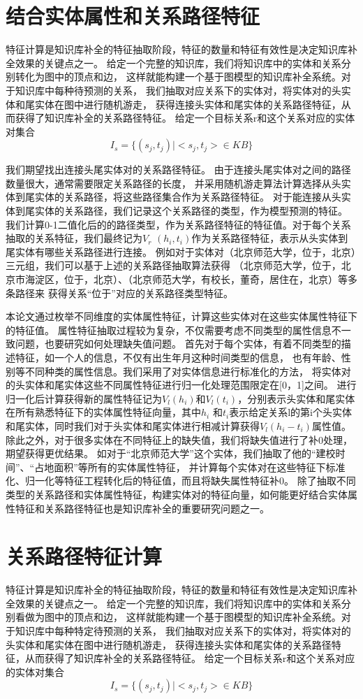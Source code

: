 \section{结合实体属性和关系路径特征}
特征计算是知识库补全的特征抽取阶段，特征的数量和特征有效性是决定知识库补全效果的关键点之一。
给定一个完整的知识库，我们将知识库中的实体和关系分别转化为图中的顶点和边，
这样就能构建一个基于图模型的知识库补全系统。对于知识库中每种待预测的关系，
我们抽取对应关系下的实体对，将实体对的头实体和尾实体在图中进行随机游走\cite{Lao2012}，
获得连接头实体和尾实体的关系路径特征，从而获得了知识库补全的关系路径特征。
给定一个目标关系r和这个关系对应的实体对集合
$$I_s=\{(s_j,t_j)|<s_j,t_j> \in KB\}$$

我们期望找出连接头尾实体对的关系路径特征。
由于连接头尾实体对之间的路径数量很大，通常需要限定关系路径的长度，
并采用随机游走算法计算选择从头实体到尾实体的关系路径，将这些路径集合作为关系路径特征。
对于能连接从头实体到尾实体的关系路径，我们记录这个关系路径的类型，作为模型预测的特征。
我们计算0-1二值化后的的路径类型，作为关系路径特征的特征值。对于每个关系抽取的关系特征，我们最终记为$V_r$ $(h_i,t_i)$作为关系路径特征，表示从头实体到尾实体有哪些关系路径进行连接。
例如对于实体对（北京师范大学，位于，北京）三元组，我们可以基于上述的关系路径抽取算法获得
（北京师范大学，位于，北京市海淀区，位于，北京）、（北京师范大学，有校长，董奇，居住在，北京）等多条路径来
获得关系“位于”对应的关系路径类型特征。

本论文通过枚举不同维度的实体属性特征，计算这些实体对在这些实体属性特征下的特征值。
属性特征抽取过程较为复杂，不仅需要考虑不同类型的属性信息不一致问题，也要研究如何处理缺失值问题。
首先对于每个实体，有着不同类型的描述特征，如一个人的信息，不仅有出生年月这种时间类型的信息，
也有年龄、性别等不同种类的属性信息。我们采用了对实体信息进行标准化的方法，
将实体对的头实体和尾实体这些不同属性特征进行归一化处理范围限定在[0，1]之间。
进行归一化后计算获得新的属性特征记为$V_l(h_i)$和$V_l (t_i)$，分别表示头实体和尾实体在所有熟悉特征下的实体属性特征向量，其中$h_i$ 和$t_i$表示给定关系l的第i个头实体和尾实体，同时我们对于头实体和尾实体进行相减计算获得$V_l(h_i-t_i )$属性值。除此之外，对于很多实体在不同特征上的缺失值，我们将缺失值进行了补0处理，期望获得更优结果。
如对于“北京师范大学”这个实体，我们抽取了他的“建校时间”、“占地面积”等所有的实体属性特征，
并计算每个实体对在这些特征下标准化、归一化等特征工程转化后的特征值，而且将缺失属性特征补0。
除了抽取不同类型的关系路径和实体属性特征，构建实体对的特征向量，如何能更好结合实体属性特征和关系路径特征也是知识库补全的重要研究问题之一。

\section{关系路径特征计算}
\label{sec:relational-compute}
特征计算是知识库补全的特征抽取阶段，特征的数量和特征有效性是决定知识库补全效果的关键点之一。
给定一个完整的知识库，我们将知识库中的实体和关系分别看做为图中的顶点和边，
这样就能构建一个基于图模型的知识库补全系统。对于知识库中每种特定待预测的关系，
我们抽取对应关系下的实体对，将实体对的头实体和尾实体在图中进行随机游走\cite{Lao2012}，
获得连接头实体和尾实体的关系路径特征，从而获得了知识库补全的关系路径特征。
给定一个目标关系r和这个关系对应的实体对集合
$$I_s=\{(s_j,t_j)|<s_j,t_j> \in KB\}$$


